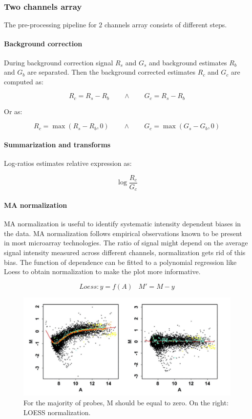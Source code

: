 		\subsubsection{Two channels array}
		The pre-processing pipeline for $2$ channels array consists of different steps.

			\paragraph{Background correction}
			During background correction signal $R_s$ and $G_s$ and background estimates $R_b$ and $G_b$ are separated.
			Then the background corrected estimates $R_c$ and $G_c$ are computed as:

			$$R_c = R_s-R_b\qquad\land\qquad G_c = R_s-R_b$$

			Or as:

			$$R_c = \max(R_s-R_b, 0)\qquad\land\qquad G_c = \max(G_s-G_b, 0)$$

			\paragraph{Summarization and transforms}
			Log-ratios estimates relative expression as:

			$$\log\frac{R_c}{G_c}$$

			\paragraph{MA normalization}
			MA normalization is useful to identify systematic intensity dependent biases in the data.
			MA normalization follows empirical observations known to be present in most microarray technologies.
			The ratio of signal might depend on the average signal intensity measured across different channels, normalization gets rid of this bias.
			The function of dependence can be fitted to a polynomial regression like Loess to obtain normalization to make the plot more informative.
			
			$$Loess: y = f (A) \,\,\,\,\, M' = M - y$$

			\begin{figure}
			\centering
			\includegraphics[scale=0.25]{MA}
			\caption{For the majority of probes, M should be equal to zero. On the right: LOESS normalization.}
			\end{figure}

